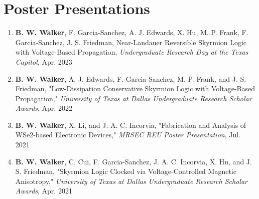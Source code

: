 \documentclass[letterpaper,11pt]{article}
\begin{document}
\section{Poster Presentations}
    \begin{itemize}[leftmargin=0.15in, label={}]
        \small{\item{
        \begin{enumerate}[leftmargin=0.15in]
          \item \small{\textbf{B. W. Walker}, F. Garcia-Sanchez, A. J. Edwards, X. Hu, M. P. Frank, F. Garcia-Sanchez, J. S. Friedman, Near-Landauer Reversible Skyrmion Logic with Voltage-Based Propagation, \textit{Undergraduate Research Day at the Texas Capitol}, Apr. 2023}
          \item \small{\textbf{B. W. Walker}, A. J. Edwards, F. Garcia-Sanchez, M. P. Frank, and J. S. Friedman, "Low-Dissipation Conservative Skyrmion Logic with Voltage-Based Propagation," \textit{University of Texas at Dallas Undergraduate Research Scholar Awards}, Apr. 2022}
          \item \small{\textbf{B. W. Walker}, X. Li, and J. A. C. Incorvia, "Fabrication and Analysis of WSe2-based Electronic Devices," \textit{MRSEC REU Poster Presentation}, Jul. 2021}
          \item \small{\textbf{B. W. Walker}, C. Cui, F. Garcia-Sanchez, J. A. C. Incorvia, X. Hu, and J. S. Friedman, "Skyrmion Logic Clocked via Voltage-Controlled Magnetic Anisotropy," \textit{University of Texas at Dallas Undergraduate Research Scholar Awards}, Apr. 2021}
        \end{enumerate}
        }}\vspace{-5pt}
     \end{itemize}
\end{document}

